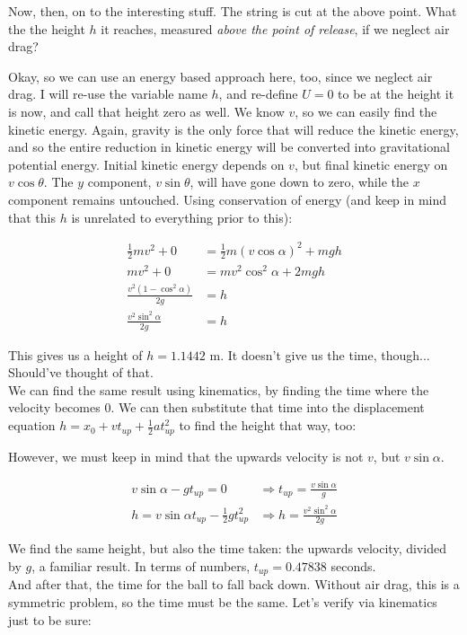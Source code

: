 \documentclass[8.01x]{subfiles}
\begin{document}
Now, then, on to the interesting stuff. The string is cut at the above point. What the the height $h$ it reaches, measured \emph{above the point of release}, if we neglect air drag?

Okay, so we can use an energy based approach here, too, since we neglect air drag. I will re-use the variable name $h$, and re-define $U = 0$ to be at the height it is now, and call that height zero as well. We know $v$, so we can easily find the kinetic energy. Again, gravity is the only force that will reduce the kinetic energy, and so the entire reduction in kinetic energy will be converted into gravitational potential energy. Initial kinetic energy depends on $v$, but final kinetic energy on $v \cos \theta$. The $y$ component, $v \sin \theta$, will have gone down to zero, while the $x$ component remains untouched. Using conservation of energy (and keep in mind that this $h$ is unrelated to everything prior to this):

\begin{align}
\frac{1}{2} m v^2 + 0 &= \frac{1}{2} m (v \cos \alpha)^2 + m g h\\
m v^2 + 0 &= m v^2 \cos^2 \alpha + 2 m g h\\
\frac{v^2 (1 - \cos^2 \alpha)}{2 g} &= h\\
\frac{v^2 \sin^2 \alpha}{2 g} &= h
\end{align}

This gives us a height of $h = 1.1442$ m. It doesn't give us the time, though... Should've thought of that.\\
We can find the same result using kinematics, by finding the time where the velocity becomes 0. We can then substitute that time into the displacement equation $\displaystyle h = x_0 + v t_{up} + \frac{1}{2} a t_{up}^2$ to find the height that way, too:

However, we must keep in mind that the upwards velocity is not $v$, but $v \sin \alpha$.

\begin{align}
v \sin \alpha - g t_{up} = 0 &\Rightarrow t_{up} = \frac{v \sin \alpha}{g}\\
h = v \sin \alpha t_{up} - \frac{1}{2} g t_{up}^2 &\Rightarrow h = \frac{v^2 \sin^2 \alpha}{2 g}
\end{align}

We find the same height, but also the time taken: the upwards velocity, divided by $g$, a familiar result. In terms of numbers, $t_{up} = 0.47838$ seconds.\\
And after that, the time for the ball to fall back down. Without air drag, this is a symmetric problem, so the time must be the same. Let's verify via kinematics just to be sure:
\end{document}
